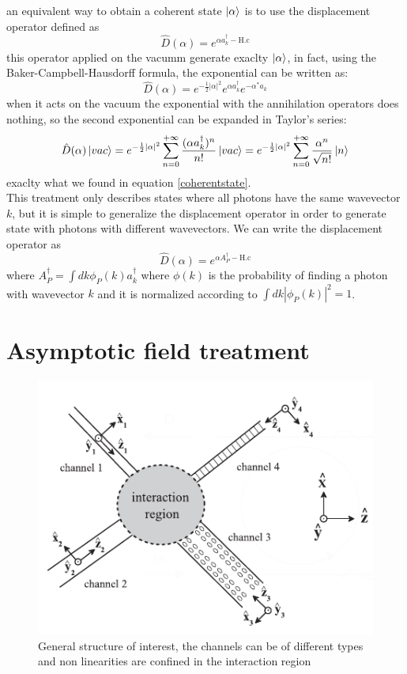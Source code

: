 \documentclass[12pt]{book}
\begin{document}
an equivalent way to obtain a coherent state $\ket{\alpha}$ is to use the displacement operator defined as 
\begin{equation}\label{def:displacement}\hat{D}(\alpha) = e^{\alpha a_k^\dagger -\text{H.c}}\end{equation}
this operator applied on the vacumm generate exaclty $\ket{\alpha}$, in fact, using the Baker-Campbell-Hausdorff formula, the exponential can be written as:
\begin{equation}\hat{D}(\alpha) = e^{-\frac{1}{2}|\alpha|^2}e^{\alpha a_k^\dagger} e^{-\alpha^* a_k}\end{equation}
when it acts on the vacuum the exponential with the annihilation operators does nothing, so the second exponential can be expanded in Taylor's series:
\begin{equation}\hat{D}(\alpha)\ket{vac} = e^{-\frac{1}{2}|\alpha|^2}\sum_{n=0}^{+\infty}\frac{(\alpha a_k^\dagger)^n}{n!}\ket{vac} = e^{-\frac{1}{2}|\alpha|^2}\sum_{n=0}^{+\infty} \frac{\alpha^n}{\sqrt{n!}}\ket{n}  \end{equation}
exaclty what we found in equation \eqref{coherentstate}.\\
This treatment only describes states where all photons have the same wavevector $k$, but it is simple to generalize the displacement operator in order to generate state with photons with different wavevectors. We can write the displacement operator as
\begin{equation}\hat{D}(\alpha) = e^{\alpha A^\dagger_P -\text{H.c}}\end{equation}
where $A^\dagger_P = \int dk \phi_P(k) a_k^\dagger$ where $\phi(k)$ is the probability of finding a photon with wavevector $k$ and it is normalized according to $\int dk |\phi_P(k)|^2 = 1$.


\section{Asymptotic field treatment}\label{section:asymptotic}
\begin{figure}
\centering
\includegraphics[width = .7\textwidth]{img/asymptotic}
\caption{General structure of interest, the channels can be of different types and non linearities are confined in the interaction region}
\label{generalstructure}
\end{figure}
\end{document}
